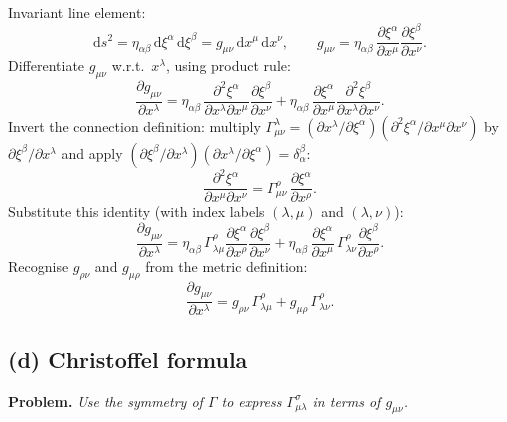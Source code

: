 \documentclass[11pt]{article}
\newcommand{\de}{\mathrm{d}}
\newcommand{\pd}[2]{\frac{\partial #1}{\partial #2}}
\begin{document}
Invariant line element:
\[
\de s^2 = \eta_{\alpha\beta}\,\de\xi^\alpha\,\de\xi^\beta = g_{\mu\nu}\,\de x^\mu\,\de x^\nu,\qquad g_{\mu\nu} = \eta_{\alpha\beta}\,\pd{\xi^\alpha}{x^\mu}\pd{\xi^\beta}{x^\nu}.
\]
Differentiate $g_{\mu\nu}$ w.r.t.\ $x^\lambda$, using product rule:
\[
\pd{g_{\mu\nu}}{x^\lambda} = \eta_{\alpha\beta}\,\frac{\partial^2\xi^\alpha}{\partial x^\lambda\partial x^\mu}\pd{\xi^\beta}{x^\nu} + \eta_{\alpha\beta}\,\pd{\xi^\alpha}{x^\mu}\frac{\partial^2\xi^\beta}{\partial x^\lambda\partial x^\nu}.
\]
Invert the connection definition: multiply $\Gamma^\lambda_{\mu\nu}=(\partial x^\lambda/\partial\xi^\alpha)(\partial^2\xi^\alpha/\partial x^\mu\partial x^\nu)$ by $\partial\xi^\beta/\partial x^\lambda$ and apply $(\partial\xi^\beta/\partial x^\lambda)(\partial x^\lambda/\partial\xi^\alpha) = \delta^\beta_\alpha$:
\[
\frac{\partial^2\xi^\alpha}{\partial x^\mu\partial x^\nu} = \Gamma^\rho_{\mu\nu}\,\pd{\xi^\alpha}{x^\rho}.
\]
Substitute this identity (with index labels $(\lambda,\mu)$ and $(\lambda,\nu)$):
\[
\pd{g_{\mu\nu}}{x^\lambda} = \eta_{\alpha\beta}\,\Gamma^\rho_{\lambda\mu}\pd{\xi^\alpha}{x^\rho}\pd{\xi^\beta}{x^\nu} + \eta_{\alpha\beta}\,\pd{\xi^\alpha}{x^\mu}\,\Gamma^\rho_{\lambda\nu}\pd{\xi^\beta}{x^\rho}.
\]
Recognise $g_{\rho\nu}$ and $g_{\mu\rho}$ from the metric definition:
\[
\boxed{\;\pd{g_{\mu\nu}}{x^\lambda} = g_{\rho\nu}\,\Gamma^\rho_{\lambda\mu} + g_{\mu\rho}\,\Gamma^\rho_{\lambda\nu}.\;}
\]
\label{eq:metric-compat}

\subsection*{(d) Christoffel formula}

\textbf{Problem.} \emph{Use the symmetry of $\Gamma$ to express $\Gamma^\sigma_{\mu\lambda}$ in terms of $g_{\mu\nu}$.}
\end{document}
